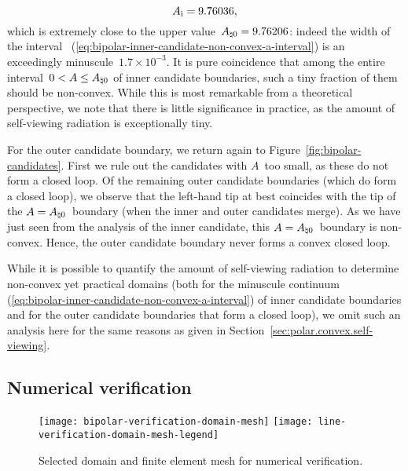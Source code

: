 \begin{equation}
  A_{\mathrm{i}} = 9.76036,
  \label{eq:bipolar-inner-candidate-a-inflection}
\end{equation}
which is extremely close to the upper value~$A_{\natural 0} = 9.76206$:
indeed the width of the interval~%
  (\ref{eq:bipolar-inner-candidate-non-convex-a-interval})
is an exceedingly minuscule~$1.7 \times 10^{-3}$.
It is pure coincidence that
among the entire interval~$0 < A \le A_{\natural 0}$
of inner candidate boundaries,
such a tiny fraction of them should be non-convex.
While this is most remarkable from a theoretical perspective,
we note that there is little significance in practice,
as the amount of self-viewing radiation is exceptionally tiny.

For the outer candidate boundary,
we return again to Figure~\ref{fig:bipolar-candidates}.
First we rule out the candidates with $A$~too small,
as these do not form a closed loop.
Of the remaining outer candidate boundaries
(which do form a closed loop),
we observe that the left-hand tip at best
coincides with the tip of the $A = A_{\natural 0}$~boundary
(when the inner and outer candidates merge).
As we have just seen from the analysis of the inner candidate,
this $A = A_{\natural 0}$~boundary is non-convex.
Hence, the outer candidate boundary
never forms a convex closed loop.

While it is possible to quantify the amount of self-viewing radiation
to determine non-convex yet practical domains
(both for the minuscule continuum~%
  (\ref{eq:bipolar-inner-candidate-non-convex-a-interval})
of inner candidate boundaries
and for the outer candidate boundaries that form a closed loop),
we omit such an analysis here
for the same reasons as given in Section~\ref{sec:polar.convex.self-viewing}.

\subsection{Numerical verification}
\label{sec:bipolar.tracing.verification}

\begin{figure}
  \centering
  \texttt{[image: bipolar-verification-domain-mesh]}
  \texttt{[image: line-verification-domain-mesh-legend]}
  \caption{
    Selected domain and finite element mesh for numerical verification.
  }
  \label{fig:bipolar-verification-domain-mesh}
\end{figure}

\begin{figure}
\end{figure}

